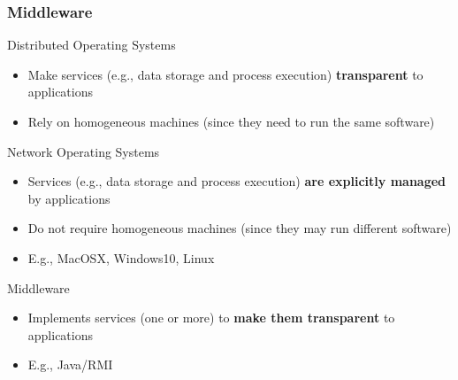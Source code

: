 \subsubsection{Middleware}
Distributed Operating Systems
\begin{itemize}
    \item Make services (e.g., data storage and process execution) \textbf{transparent} to applications
    \item Rely on homogeneous machines (since they need to run the same software)
\end{itemize}
Network Operating Systems
\begin{itemize}
    \item Services (e.g., data storage and process execution) \textbf{are explicitly managed} by applications
    \item Do not require homogeneous machines (since they may run different software)
    \item E.g., MacOSX, Windows10, Linux
\end{itemize}
Middleware
\begin{itemize}
    \item Implements services (one or more) to \textbf{make them transparent} to applications
    \item E.g., Java/RMI
\end{itemize}

